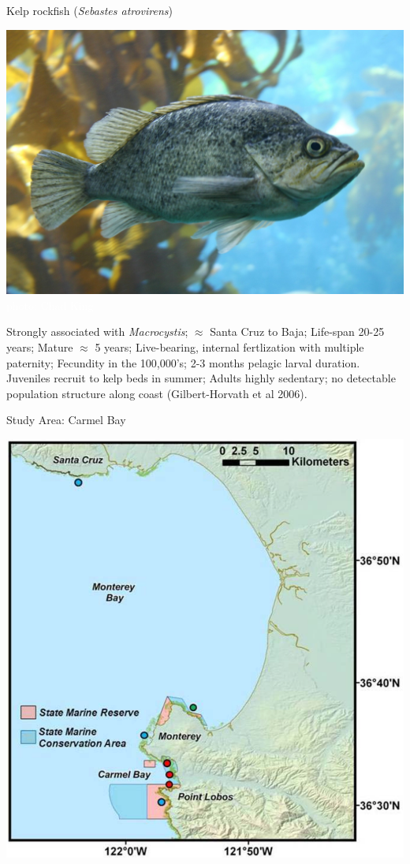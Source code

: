 \documentclass[letter,graphicx]{beamer}
\begin{document}
\begin{frame}{Kelp rockfish ({\em Sebastes atrovirens})}
\begin{center}
\includegraphics[width=.7\textwidth]{./figs/kelpy.jpg}\\
{\tiny \vspace*{-6ex} \textcolor{white}{photo: Chad King}}
\end{center}
{\tiny  Strongly associated with {\em Macrocystis}; $\approx$ Santa Cruz to Baja; 
Life-span 20-25 years; Mature $\approx$ 5 years; Live-bearing, internal fertlization with multiple paternity; Fecundity in the 100,000's; 2-3 months pelagic larval duration.  Juveniles recruit to kelp beds in summer; Adults highly sedentary; no detectable population structure along coast (Gilbert-Horvath et al 2006).
}
\end{frame}





\begin{frame}{Study Area: Carmel Bay}
\begin{center}
\includegraphics[width=.7\textwidth]{./figs/carmel_bay.png}\\
\end{center}
\end{frame}
\end{document}
